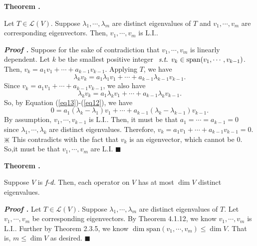 \documentclass[11pt, letterpaper]{article}
\newcounter{index}[subsection]
\newenvironment*{thm}[1]{\begin{tcolorbox}\par\noindent\textbf{Theorem \thesubsection.\stepcounter{index}\theindex\ #1} \par}{\par\end{tcolorbox}}
\newcounter{nprf}[subsection]
\newenvironment*{prf}{\par\indent\textbf{\textit{Proof \stepcounter{nprf}\thenprf.}}}{\hfill$\blacksquare$\par}
\def\L{\mathcal{L}}
\def\st{\emph{ s.t. }}
\def\LI{\mathrm{L.I.}}
\def\FD{\emph{f-d}}
\def\span{\mathrm{span}}
\begin{document}
\begin{thm}{}
	Let $T\in\L(V)$. Suppose $\lambda_1,\cdots,\lambda_m$ are distinct eigenvalues of $T$ and $v_1,\cdots,v_m$ are corresponding eigenvectors. Then, $v_1,\cdots,v_m$ is $\LI$.
\end{thm}
\begin{prf}
	Suppose for the sake of contradiction that $v_1,\cdots,v_m$ is linearly dependent. Let $k$ be the smallest positive integer $\st v_k\in\span(v_1,\cdots,v_{k-1})$. Then, $v_k=a_1v_1+\cdots+a_{k-1}v_{k-1}$. Applying $T$, we have \begin{equation}\label{eq12}\lambda_kv_k=a_1\lambda_1v_1+\cdots+a_{k-1}\lambda_{k-1}v_{k-1}.\end{equation} Since $v_k=a_1v_1+\cdots+a_{k-1}v_{k-1}$, we also have \begin{equation}\label{eq13}\lambda_kv_k=a_1\lambda_kv_1+\cdots+a_{k-1}\lambda_kv_{k-1}.\end{equation} So, by Equation (\ref{eq13})-(\ref{eq12}), we have \[0=a_1(\lambda_k-\lambda_1)v_1+\cdots+a_{k-1}(\lambda_k-\lambda_{k-1})v_{k-1}.\] By assumption, $v_1,\cdots,v_{k-1}$ is $\LI$. Then, it must be that $a_1=\cdots=a_{k-1}=0$ since $\lambda_1,\cdots,\lambda_k$ are distinct eigenvalues. Therefore, $v_k=a_1v_1+\cdots+a_{k-1}v_{k-1}=0.$ $\divideontimes$ This contradicts with the fact that $v_k$ is an eigenvector, which cannot be $0$. So,it must be that $v_1,\cdots,v_m$ are $\LI$
\end{prf}
\begin{thm}{}
	Suppose $V$ is $\FD$. Then, each operator on $V$ has at most $\dim V$ distinct eigenvalues.	
\end{thm}
\begin{prf}
	Let $T\in\L(V)$. Suppose $\lambda_1,\cdots,\lambda_m$ are distinct eigenvalues of $T$. Let $v_1,\cdots,v_m$ be corresponding eigenvectors. By Theorem 4.1.12, we know $v_1,\cdots,v_m$ is $\LI$. Further by Theorem 2.3.5, we know $\dim\span(v_1,\cdots,v_m)\leq\dim V$. That is, $m\leq\dim V$ as desired. 	
\end{prf}

\newpage
\end{document}
